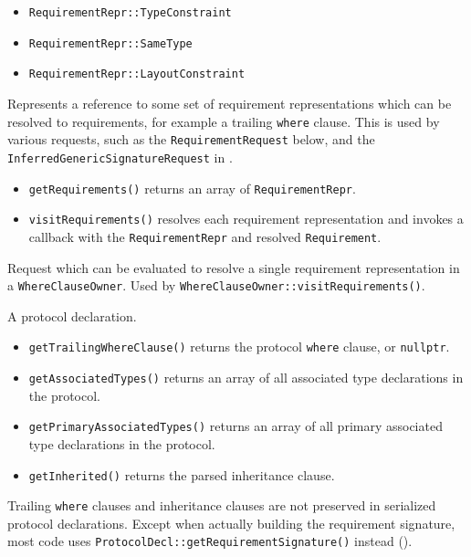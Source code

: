 \documentclass[../generics]{subfiles}
\begin{document}
\begin{itemize}
\item \texttt{RequirementRepr::TypeConstraint}
\item \texttt{RequirementRepr::SameType}
\item \texttt{RequirementRepr::LayoutConstraint}
\end{itemize}

Represents a reference to some set of requirement representations which can be resolved to requirements, for example a trailing \texttt{where} clause. This is used by various requests, such as the \texttt{RequirementRequest} below, and the \texttt{InferredGenericSignatureRequest} in .
\begin{itemize}
\item \texttt{getRequirements()} returns an array of \texttt{RequirementRepr}.
\item \texttt{visitRequirements()} resolves each requirement representation and invokes a callback with the \texttt{RequirementRepr} and resolved \texttt{Requirement}.
\end{itemize}

Request which can be evaluated to resolve a single requirement representation in a \texttt{WhereClauseOwner}. Used by \texttt{WhereClauseOwner::visitRequirements()}.

A protocol declaration.
\begin{itemize}
\item \texttt{getTrailingWhereClause()} returns the protocol \texttt{where} clause, or \texttt{nullptr}.
\item \texttt{getAssociatedTypes()} returns an array of all associated type declarations in the protocol.
\item \texttt{getPrimaryAssociatedTypes()} returns an array of all primary associated type declarations in the protocol.
\item \texttt{getInherited()} returns the parsed inheritance clause.
\end{itemize}

Trailing \texttt{where} clauses and inheritance clauses are not preserved in serialized protocol declarations. Except when actually building the requirement signature, most code uses \texttt{ProtocolDecl::getRequirementSignature()} instead ().
\end{document}
